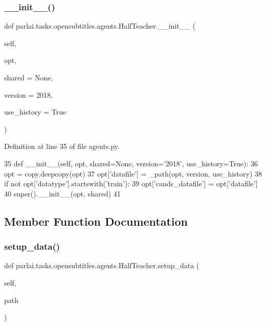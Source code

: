 \subsubsection{\texorpdfstring{\+\_\+\+\_\+init\+\_\+\+\_\+()}{\_\_init\_\_()}}
{\footnotesize\ttfamily def parlai.\+tasks.\+opensubtitles.\+agents.\+Half\+Teacher.\+\_\+\+\_\+init\+\_\+\+\_\+ (\begin{DoxyParamCaption}\item[{}]{self,  }\item[{}]{opt,  }\item[{}]{shared = {\ttfamily None},  }\item[{}]{version = {\ttfamily \textquotesingle{}2018\textquotesingle{}},  }\item[{}]{use\+\_\+history = {\ttfamily True} }\end{DoxyParamCaption})}



Definition at line 35 of file agents.\+py.


\begin{DoxyCode}
35     \textcolor{keyword}{def }\_\_init\_\_(self, opt, shared=None, version='2018', use\_history=True):
36         opt = copy.deepcopy(opt)
37         opt[\textcolor{stringliteral}{'datafile'}] = \_path(opt, version, use\_history)
38         \textcolor{keywordflow}{if} \textcolor{keywordflow}{not} opt[\textcolor{stringliteral}{'datatype'}].startswith(\textcolor{stringliteral}{'train'}):
39             opt[\textcolor{stringliteral}{'cands\_datafile'}] = opt[\textcolor{stringliteral}{'datafile'}]
40         super().\_\_init\_\_(opt, shared)
41 
\end{DoxyCode}


\subsection{Member Function Documentation}
\mbox{\label{classparlai_1_1tasks_1_1opensubtitles_1_1agents_1_1HalfTeacher_a36081b74536cdad3bc3673b324da1f02}} 
\subsubsection{\texorpdfstring{setup\+\_\+data()}{setup\_data()}}
{\footnotesize\ttfamily def parlai.\+tasks.\+opensubtitles.\+agents.\+Half\+Teacher.\+setup\+\_\+data (\begin{DoxyParamCaption}\item[{}]{self,  }\item[{}]{path }\end{DoxyParamCaption})}



